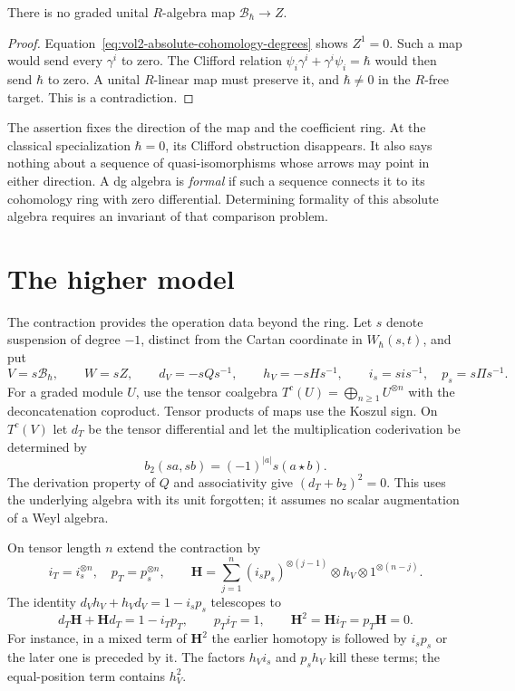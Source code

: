 \begin{proposition}\label{prop:vol2-absolute-no-strict-projection}
There is no graded unital $R$-algebra map
$\mathcal B_\hbar\to Z$.
\end{proposition}

\begin{proof}
Equation~\eqref{eq:vol2-absolute-cohomology-degrees} shows
$Z^1=0$. Such a map would send every $\gamma^i$ to zero.
The Clifford relation
$\psi_i\gamma^i+\gamma^i\psi_i=\hbar$ would then send
$\hbar$ to zero. A unital $R$-linear map must preserve it,
and $\hbar\ne0$ in the $R$-free target. This is a contradiction.
\end{proof}

The assertion fixes the direction of the map and the coefficient
ring. At the classical specialization $\hbar=0$, its Clifford
obstruction disappears. It also says nothing about a sequence
of quasi-isomorphisms whose arrows may point in either direction.
A dg algebra is \emph{formal} if such a sequence connects it
to its cohomology ring with zero differential. Determining
formality of this absolute algebra requires an invariant of
that comparison problem.

\section{The higher model}
\label{sec:vol2-absolute-higher-model}

The contraction provides the operation data beyond the ring.
Let $s$ denote suspension of degree $-1$, distinct from the
Cartan coordinate in $W_\hbar(s,t)$, and put
\[
 V=s\mathcal B_\hbar,\qquad W=sZ,
 \qquad d_V=-sQs^{-1},\qquad h_V=-sHs^{-1},
 \qquad i_s=sis^{-1},\quad p_s=s\Pi s^{-1}.
\]
For a graded module $U$, use the tensor coalgebra
$T^c(U)=\bigoplus_{n\geq1}U^{\otimes n}$ with the
deconcatenation coproduct. Tensor products of maps use the
Koszul sign. On $T^c(V)$ let $d_T$ be the tensor differential
and let the multiplication coderivation be determined by
\begin{equation}\label{eq:vol2-absolute-bar-multiplication}
 b_2(sa,sb)=(-1)^{|a|}s(a\star b).
\end{equation}
The derivation property of $Q$ and associativity give
$(d_T+b_2)^2=0$.
This uses the underlying algebra with its unit forgotten;
it assumes no scalar augmentation of a Weyl algebra.

On tensor length $n$ extend the contraction by
\begin{equation}\label{eq:vol2-absolute-tensor-homotopy}
 i_T=i_s^{\otimes n},\quad p_T=p_s^{\otimes n},\qquad
 \mathbf H=
 \sum_{j=1}^n(i_sp_s)^{\otimes(j-1)}
                     \otimes h_V\otimes1^{\otimes(n-j)}.
\end{equation}
The identity $d_Vh_V+h_Vd_V=1-i_sp_s$ telescopes to
\[
 d_T\mathbf H+\mathbf H d_T=1-i_Tp_T,
 \qquad p_Ti_T=1,
 \qquad \mathbf H^2=\mathbf H i_T=p_T\mathbf H=0.
\]
For instance, in a mixed term of $\mathbf H^2$ the earlier
homotopy is followed by $i_sp_s$ or the later one is preceded
by it. The factors $h_Vi_s$ and $p_sh_V$ kill these terms;
the equal-position term contains $h_V^2$.

